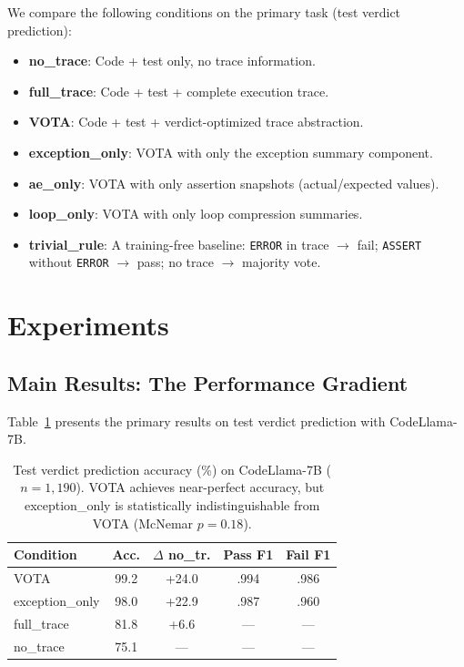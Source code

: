 \documentclass[11pt,a4paper]{article}
\begin{document}
We compare the following conditions on the primary task (test verdict prediction):
\begin{itemize}
\item \textbf{no\_trace}: Code + test only, no trace information.
\item \textbf{full\_trace}: Code + test + complete execution trace.
\item \textbf{VOTA}: Code + test + verdict-optimized trace abstraction.
\item \textbf{exception\_only}: VOTA with only the exception summary component.
\item \textbf{ae\_only}: VOTA with only assertion snapshots (actual/expected values).
\item \textbf{loop\_only}: VOTA with only loop compression summaries.
\item \textbf{trivial\_rule}: A training-free baseline: \texttt{ERROR} in trace $\to$ fail; \texttt{ASSERT} without \texttt{ERROR} $\to$ pass; no trace $\to$ majority vote.
\end{itemize}

\section{Experiments}
\label{sec:experiments}

\subsection{Main Results: The Performance Gradient}
\label{sec:main}

Table~\ref{tab:main} presents the primary results on test verdict prediction with CodeLlama-7B.

\begin{table}[t]
\centering
\small
\begin{tabular}{lcccc}
\toprule
\textbf{Condition} & \textbf{Acc.} & \textbf{$\Delta$ no\_tr.} & \textbf{Pass F1} & \textbf{Fail F1} \\
\midrule
VOTA & 99.2 & +24.0 & .994 & .986 \\
exception\_only & 98.0 & +22.9 & .987 & .960 \\
full\_trace & 81.8 & +6.6 & --- & --- \\
no\_trace & 75.1 & --- & --- & --- \\
\bottomrule
\end{tabular}
\caption{Test verdict prediction accuracy (\%) on CodeLlama-7B ($n = 1{,}190$). VOTA achieves near-perfect accuracy, but exception\_only is statistically indistinguishable from VOTA (McNemar $p=0.18$).}
\label{tab:main}
\end{table}
\end{document}

